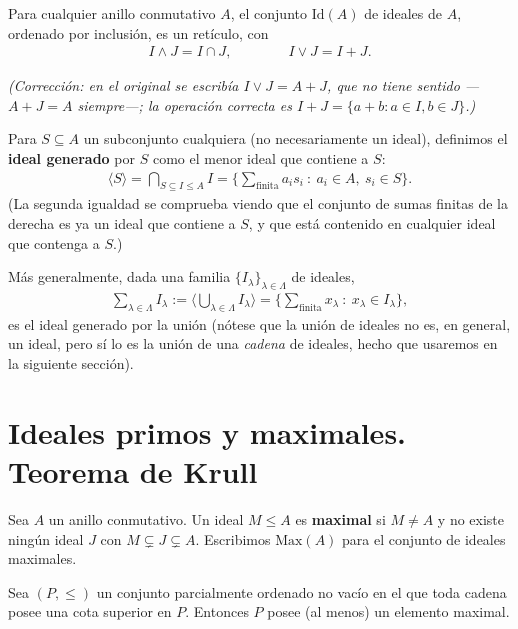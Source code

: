 \begin{prop}
Para cualquier anillo conmutativo $A$, el conjunto $\mathrm{Id}(A)$ de ideales de $A$, ordenado por inclusión, es un retículo, con
\begin{gather*}
    I \wedge J = I \cap J, \qquad\qquad I \vee J = I + J.
\end{gather*}
\end{prop}

\emph{(Corrección: en el original se escribía $I\vee J = A+J$, que no tiene sentido —$A+J=A$ siempre—; la operación correcta es $I+J = \{a+b: a\in I, b\in J\}$.)}

Para $S \subseteq A$ un subconjunto cualquiera (no necesariamente un ideal), definimos el \textbf{ideal generado} por $S$ como el menor ideal que contiene a $S$:
\begin{gather*}
    \langle S \rangle = \bigcap_{S \subseteq I \leq A} I = \Big\{\sum_{\text{finita}} a_i s_i \ :\ a_i\in A,\ s_i\in S\Big\}.
\end{gather*}
(La segunda igualdad se comprueba viendo que el conjunto de sumas finitas de la derecha es ya un ideal que contiene a $S$, y que está contenido en cualquier ideal que contenga a $S$.)

Más generalmente, dada una familia $\{I_\lambda\}_{\lambda \in \Lambda}$ de ideales,
\begin{gather*}
    \sum_{\lambda \in \Lambda} I_\lambda := \Big\langle \bigcup_{\lambda \in \Lambda} I_\lambda \Big\rangle = \Big\{\sum_{\text{finita}} x_\lambda \ : \ x_\lambda \in I_\lambda\Big\},
\end{gather*}
es el ideal generado por la unión (nótese que la unión de ideales no es, en general, un ideal, pero sí lo es la unión de una \emph{cadena} de ideales, hecho que usaremos en la siguiente sección).

\section{Ideales primos y maximales. Teorema de Krull}

\begin{definicion}
Sea $A$ un anillo conmutativo. Un ideal $M\leq A$ es \textbf{maximal} si $M\neq A$ y no existe ningún ideal $J$ con $M\subsetneq J \subsetneq A$. Escribimos $\mathrm{Max}(A)$ para el conjunto de ideales maximales.
\end{definicion}

\begin{teo}\label{lema:zorn}
Sea $(P,\leq)$ un conjunto parcialmente ordenado no vacío en el que toda cadena posee una cota superior en $P$. Entonces $P$ posee (al menos) un elemento maximal.
\end{teo}

